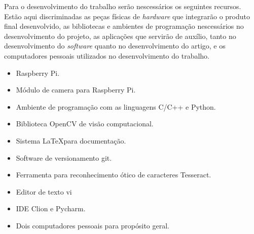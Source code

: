 Para o desenvolvimento do trabalho serão nescessários os seguintes recursos.
Estão aqui discriminadas as peças físicas de \emph{hardware} que integrarão o
produto final desenvolvido, as bibliotecas e ambientes de programação
nescessários no desenvolvimento do projeto, as aplicações que servirão de
auxílio, tanto no desenvolvimento do \emph{software} quanto no desenvolvimento
do artigo, e os computadores pessoais utilizados no desenvolvimento do trabalho.

\begin{itemize}
	\item Raspberry Pi.
	\item Módulo de camera para Raspberry Pi.
	\item Ambiente de programação com as linguagens C/C++ e Python.
	\item Biblioteca OpenCV de visão computacional.
	\item Sistema \LaTeX para documentação.
	\item Software de versionamento git.
	\item Ferramenta para reconhecimento ótico de caracteres Tesseract.
	\item Editor de texto vi
	\item IDE Clion e Pycharm.
	\item Dois computadores pessoais para propósito geral.
\end{itemize}
